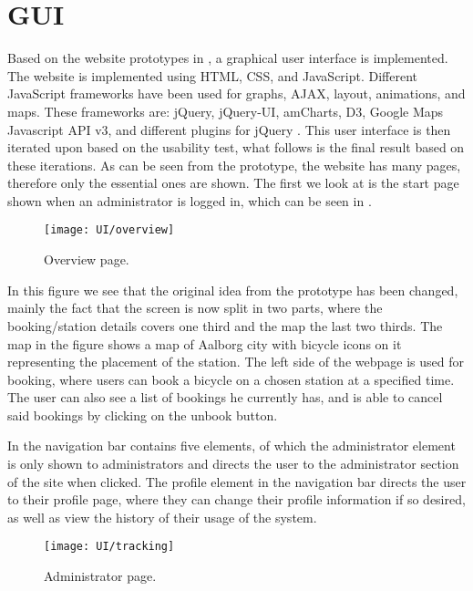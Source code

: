 \section{GUI}

Based on the website prototypes in , a graphical user interface is implemented.
The website is implemented using HTML, CSS, and JavaScript. 
Different JavaScript frameworks have been used for graphs, AJAX, layout, animations, and maps. 
These frameworks are: jQuery, jQuery-UI, amCharts, D3, Google Maps Javascript API v3, and different plugins for jQuery \citep{misc:googlehostedlibs, misc:d3js, misc:googlemapsapi, misc:amcharts}.
This user interface is then iterated upon based on the usability test, what follows is the final result based on these iterations. 
As can be seen from the prototype, the website has many pages, therefore only the essential ones are shown.
The first we look at is the start page shown when an administrator is logged in, which can be seen in .

\begin{figure}[h]
	\centering
	\texttt{[image: UI/overview]}
	\caption{Overview page.}\label{fig:UI-overview}
\end{figure}

In this figure we see that the original idea from the prototype has been changed, mainly the fact that the screen is now split in two parts, where the booking/station details covers one third and the map the last two thirds.
The map in the figure shows a map of Aalborg city with bicycle icons on it representing the placement of the station.
The left side of the webpage is used for booking, where users can book a bicycle on a chosen station at a specified time.
The user can also see a list of bookings he currently has, and is able to cancel said bookings by clicking on the unbook button.

In  the navigation bar contains five elements, of which the administrator element is only shown to administrators and directs the user to the administrator section of the site when clicked.
The profile element in the navigation bar directs the user to their profile page, where they can change their profile information if so desired, as well as view the history of their usage of the system.

\begin{figure}[h]
	\centering
	\texttt{[image: UI/tracking]}
	\caption{Administrator page.}\label{fig:UI-admin}
\end{figure}

